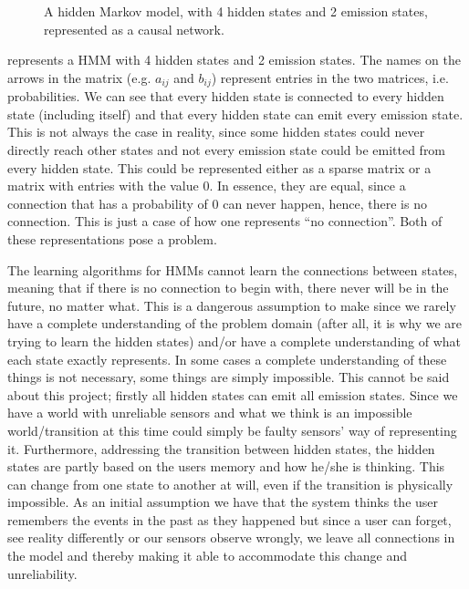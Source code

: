 \begin{figure}[htbp]
\caption[A hidden Markov model represented as a causal network.]{A hidden Markov model, with 4 hidden states and 2 emission states, represented as a causal network.}\label{fig:HMMCausalNet}
\end{figure}

 represents a HMM with 4 hidden states and 2 emission states. The names on the arrows in the matrix (e.g. $a_{ij}$ and $b_{ij}$) represent entries in the two matrices, i.e. probabilities. We can see that every hidden state is connected to every hidden state (including itself) and that every hidden state can emit every emission state. This is not always the case in reality, since some hidden states could never directly reach other states and not every emission state could be emitted from every hidden state. This could be represented either as a sparse matrix or a matrix with entries with the value 0. In essence, they are equal, since a connection that has a probability of 0 can never happen, hence, there is no connection. This is just a case of how one represents \enquote{no connection}. Both of these representations pose a problem.

The learning algorithms for HMMs cannot learn the connections between states, meaning that if there is no connection to begin with, there never will be in the future, no matter what. This is a dangerous assumption to make since we rarely have a complete understanding of the problem domain (after all, it is why we are trying to learn the hidden states) and/or have a complete understanding of what each state exactly represents. In some cases a complete understanding of these things is not necessary, some things are simply impossible. This cannot be said about this project; firstly all hidden states can emit all emission states. Since we have a world with unreliable sensors and what we think is an impossible world/transition at this time could simply be faulty sensors' way of representing it. Furthermore, addressing the transition between hidden states, the hidden states are partly based on the users memory and how he/she is thinking. This can change from one state to another at will, even if the transition is physically impossible. As an initial assumption we have that the system thinks the user remembers the events in the past as they happened but since a user can forget, see reality differently or our sensors observe wrongly, we leave all connections in the model and thereby making it able to accommodate this change and unreliability.

